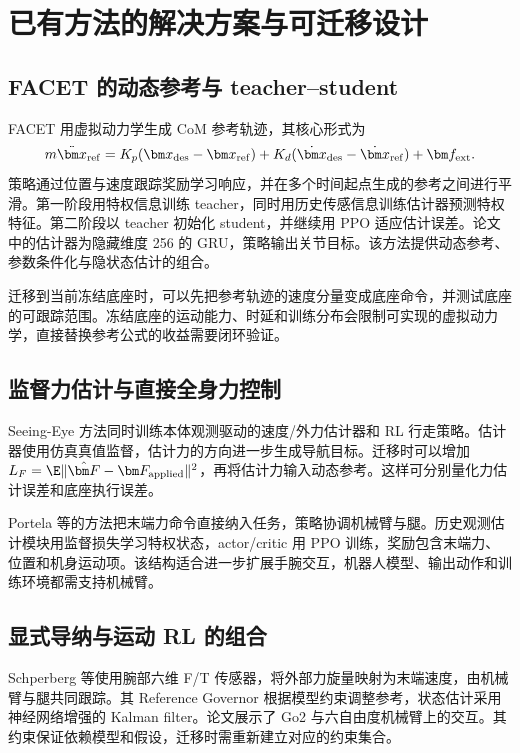 \section{已有方法的解决方案与可迁移设计}
\subsection{FACET 的动态参考与 teacher--student}
FACET 用虚拟动力学生成 CoM 参考轨迹，其核心形式为
\begin{equation}
 m\ddot{\bm x}_{\rm ref}=K_p(\bm x_{\rm des}-\bm x_{\rm ref})
 +K_d(\dot{\bm x}_{\rm des}-\dot{\bm x}_{\rm ref})+\bm f_{\rm ext}.
\end{equation}
策略通过位置与速度跟踪奖励学习响应，并在多个时间起点生成的参考之间进行平滑。第一阶段用特权信息训练 teacher，同时用历史传感信息训练估计器预测特权特征。第二阶段以 teacher 初始化 student，并继续用 PPO 适应估计误差。论文中的估计器为隐藏维度 256 的 GRU，策略输出关节目标。该方法提供动态参考、参数条件化与隐状态估计的组合。\cite{facet2025}

迁移到当前冻结底座时，可以先把参考轨迹的速度分量变成底座命令，并测试底座的可跟踪范围。冻结底座的运动能力、时延和训练分布会限制可实现的虚拟动力学，直接替换参考公式的收益需要闭环验证。

\subsection{监督力估计与直接全身力控制}
Seeing-Eye 方法同时训练本体观测驱动的速度/外力估计器和 RL 行走策略。估计器使用仿真真值监督，估计力的方向进一步生成导航目标。迁移时可以增加
$L_F=\E\|\hat{\bm F}-\bm F_{\rm applied}\|^2$，再将估计力输入动态参考。这样可分别量化力估计误差和底座执行误差。\cite{defazio2023}

Portela 等的方法把末端力命令直接纳入任务，策略协调机械臂与腿。历史观测估计模块用监督损失学习特权状态，actor/critic 用 PPO 训练，奖励包含末端力、位置和机身运动项。该结构适合进一步扩展手腕交互，机器人模型、输出动作和训练环境都需支持机械臂。\cite{portela2024}

\subsection{显式导纳与运动 RL 的组合}
Schperberg 等使用腕部六维 F/T 传感器，将外部力旋量映射为末端速度，由机械臂与腿共同跟踪。其 Reference Governor 根据模型约束调整参考，状态估计采用神经网络增强的 Kalman filter。论文展示了 Go2 与六自由度机械臂上的交互。其约束保证依赖模型和假设，迁移时需重新建立对应的约束集合。\cite{schperberg2026}

